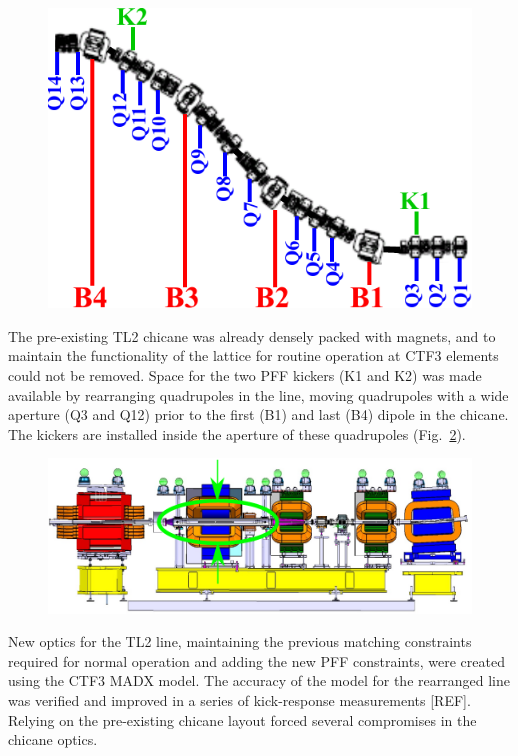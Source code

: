 \documentclass[%
 reprint,
 superscriptaddress,
 amsmath,
 amssymb,
 prstab,
]{revtex4-1}
\begin{document}
\begin{figure}
	\includegraphics[width=\columnwidth]{figs/optics/TL2Lattice_chicaneOnly}%
	\caption{\label{f:TL2Lattice}
	}
\end{figure}

The pre-existing TL2 chicane was already densely packed with magnets, and to 
maintain the functionality of the lattice for routine operation at CTF3 
elements could not be removed.
Space for the two PFF kickers (K1 and K2) was made available by rearranging 
quadrupoles in the line, moving quadrupoles with a wide aperture (Q3 and Q12) 
prior to the first (B1) and last (B4) dipole in the chicane.
The kickers are installed inside the aperture of these quadrupoles 
(Fig.~\ref{f:kickerInsideQuad}). 

\begin{figure}
	\includegraphics[width=\columnwidth]{figs/optics/kickerInsideQuad}%
	\caption{\label{f:kickerInsideQuad}
	}
\end{figure}

New optics for the TL2 line, maintaining the previous matching constraints 
required for normal operation and adding the new PFF constraints, were created 
using the CTF3 MADX model. The accuracy of the model for the rearranged line 
was verified and improved in a series of kick-response measurements [REF]. 
Relying on the pre-existing chicane layout forced several compromises in the 
chicane optics.
\end{document}
